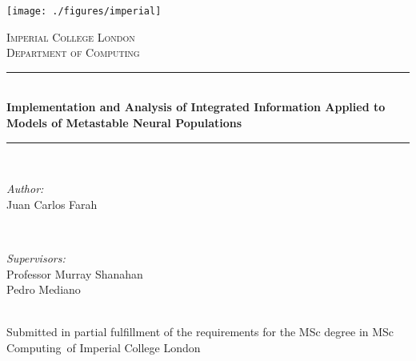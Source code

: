 \documentclass[a4paper,11pt]{article}
\newcommand{\reporttitle}{Implementation and Analysis of Integrated Information Applied to Models of Metastable Neural Populations}
\newcommand{\reportauthor}{Juan Carlos Farah}
\newcommand{\supervisor}{Professor Murray Shanahan\\Pedro Mediano}
\newcommand{\degreetype}{MSc Computing}
\begin{document}
\newcommand{\HRule}{\rule{\linewidth}{0.5mm}}


\texttt{[image: ./figures/imperial]}\\[0.5cm]

\begin{center}


\textsc{\Large Imperial College London}\\[0.5cm]
\textsc{\large Department of Computing}\\[0.5cm]


\HRule \\[0.4cm]
{ \huge \bfseries \reporttitle}\\
\HRule \\[1.5cm]


\begin{minipage}{0.4\textwidth}
\begin{flushleft} \large
\emph{Author:}\\
\reportauthor
\end{flushleft}
\end{minipage}
~
\begin{minipage}{0.4\textwidth}
\begin{flushright} \large
\emph{Supervisors:} \\
\supervisor
\end{flushright}
\end{minipage}\\[4cm]


\vfill %
Submitted in partial fulfillment of the requirements for the MSc degree in
\degreetype~of Imperial College London\\[0.5cm]

\makeatletter
\@date
\makeatother

\end{center}
\end{document}
